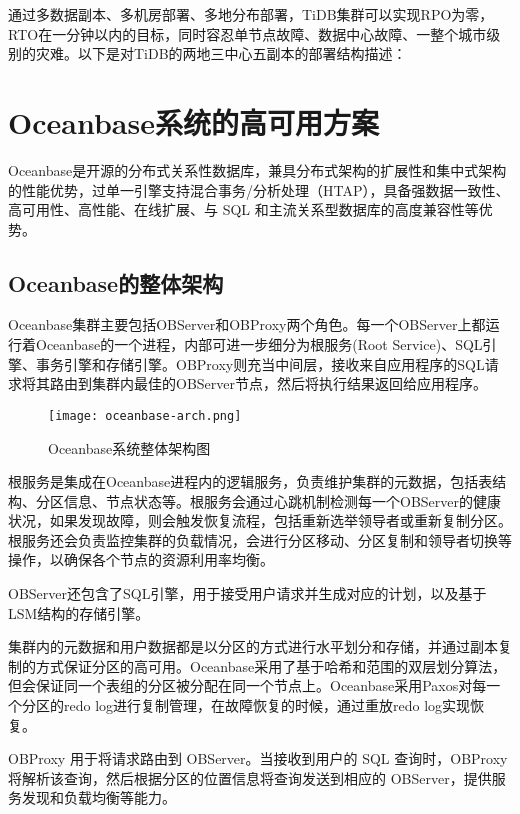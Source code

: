 通过多数据副本、多机房部署、多地分布部署，TiDB集群可以实现RPO为零，RTO在一分钟以内的目标，同时容忍单节点故障、数据中心故障、一整个城市级别的灾难。以下是对TiDB的两地三中心五副本的部署结构描述：




\section{Oceanbase系统的高可用方案}

Oceanbase是开源的分布式关系性数据库，兼具分布式架构的扩展性和集中式架构的性能优势，过单一引擎支持混合事务/分析处理（HTAP），具备强数据一致性、高可用性、高性能、在线扩展、与 SQL 和主流关系型数据库的高度兼容性等优势。

\subsection{Oceanbase的整体架构}

Oceanbase集群主要包括OBServer和OBProxy两个角色。每一个OBServer上都运行着Oceanbase的一个进程，内部可进一步细分为根服务(Root Service)、SQL引擎、事务引擎和存储引擎。OBProxy则充当中间层，接收来自应用程序的SQL请求将其路由到集群内最佳的OBServer节点，然后将执行结果返回给应用程序。

\begin{figure}
  \centering
  \texttt{[image: oceanbase-arch.png]}
  \caption{Oceanbase系统整体架构图}
  \label{fig:oceanbase-arch}
\end{figure}

根服务是集成在Oceanbase进程内的逻辑服务，负责维护集群的元数据，包括表结构、分区信息、节点状态等。根服务会通过心跳机制检测每一个OBServer的健康状况，如果发现故障，则会触发恢复流程，包括重新选举领导者或重新复制分区。根服务还会负责监控集群的负载情况，会进行分区移动、分区复制和领导者切换等操作，以确保各个节点的资源利用率均衡。

OBServer还包含了SQL引擎，用于接受用户请求并生成对应的计划，以及基于LSM结构的存储引擎。

集群内的元数据和用户数据都是以分区的方式进行水平划分和存储，并通过副本复制的方式保证分区的高可用。Oceanbase采用了基于哈希和范围的双层划分算法，但会保证同一个表组的分区被分配在同一个节点上。Oceanbase采用Paxos对每一个分区的redo log进行复制管理，在故障恢复的时候，通过重放redo log实现恢复。

OBProxy 用于将请求路由到 OBServer。当接收到用户的 SQL 查询时，OBProxy 将解析该查询，然后根据分区的位置信息将查询发送到相应的 OBServer，提供服务发现和负载均衡等能力。


